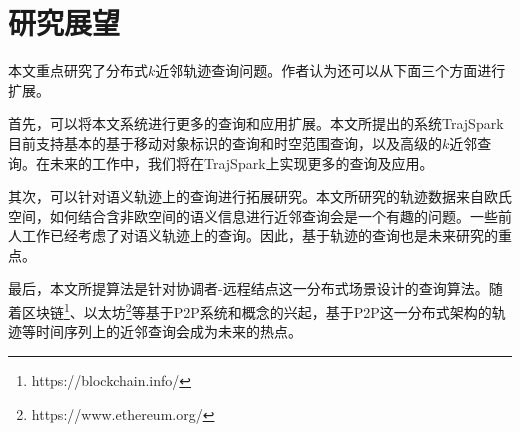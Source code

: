 \section{研究展望}
本文重点研究了分布式$k$近邻轨迹查询问题。作者认为还可以从下面三个方面进行扩展。

首先，可以将本文系统进行更多的查询和应用扩展。本文所提出的系统TrajSpark目前支持基本的基于移动对象标识的查询和时空范围查询，以及高级的$k$近邻查询。在未来的工作中，我们将在TrajSpark上实现更多的查询及应用。

其次，可以针对语义轨迹上的查询进行拓展研究。本文所研究的轨迹数据来自欧氏空间，如何结合含非欧空间的语义信息进行近邻查询会是一个有趣的问题。一些前人工作\cite{Xiao,Kaiser,WangBCSSQ17}已经考虑了对语义轨迹上的查询。因此，基于轨迹的查询也是未来研究的重点。
	

最后，本文所提算法是针对协调者-远程结点这一分布式场景设计的查询算法。随着区块链\footnote{https://blockchain.info/}、以太坊\footnote{https://www.ethereum.org/}等基于P2P系统和概念的兴起，基于P2P这一分布式架构的轨迹等时间序列上的近邻查询会成为未来的热点。
\clearpage
\phantom{s}
\clearpage